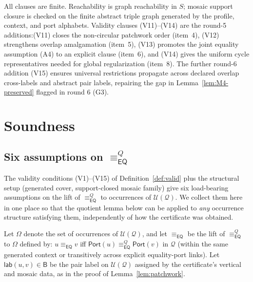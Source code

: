\documentclass[11pt]{article}
\newcommand{\Base}{\mathsf{B}}
\newcommand{\EQ}{\mathsf{EQ}}
\newcommand{\Q}{\mathcal Q}
\newcommand{\U}{\mathcal U}
\newcommand{\Port}{\mathsf{Port}}
\newcommand{\eqc}{\equiv_{\EQ}}
\newcommand{\lab}{\mathsf{lab}}
\begin{document}
All clauses are finite.  Reachability is graph reachability in $S$;
mosaic support closure is checked on the finite abstract triple graph
generated by the profile, context, and port alphabets.  Validity
clauses (V11)--(V14) are the round-5 additions:\@ (V11) closes the
non-circular patchwork order (item~4), (V12) strengthens overlap
amalgamation (item~5), (V13) promotes the joint equality assumption
(A4) to an explicit clause (item~6), and (V14) gives the uniform
cycle representatives needed for global regularization (item~8).
The further round-6 addition (V15) ensures universal restrictions
propagate across declared overlap cross-labels and abstract pair
labels, repairing the gap in Lemma~\ref{lem:M4-preserved} flagged
in round 6 (G3).

\section{Soundness}

\subsection{Six assumptions on \texorpdfstring{$\eqc^Q$}{the equality congruence}}
\label{ssec:six-assumptions}

The validity conditions (V1)--(V15) of Definition~\ref{def:valid}
plus the structural setup (generated cover, support-closed mosaic
family) give six load-bearing assumptions on the lift of $\eqc^Q$ to
occurrences of $\U(\Q)$.  We collect them here in one place so that
the quotient lemma below can be applied to \emph{any} occurrence
structure satisfying them, independently of how the certificate was
obtained.

Let $\Omega$ denote the set of occurrences of $\U(\Q)$, and let
$\eqc$ be the lift of $\eqc^Q$ to $\Omega$ defined by:
$u\eqc v$ iff $\Port(u)\eqc^Q\Port(v)$ in $\Q$ (within the same
generated context or transitively across explicit equality-port
links).  Let $\lab(u,v)\in\Base$ be the pair label on $\U(\Q)$
assigned by the certificate's vertical and mosaic data, as in the
proof of Lemma~\ref{lem:patchwork}.
\end{document}
